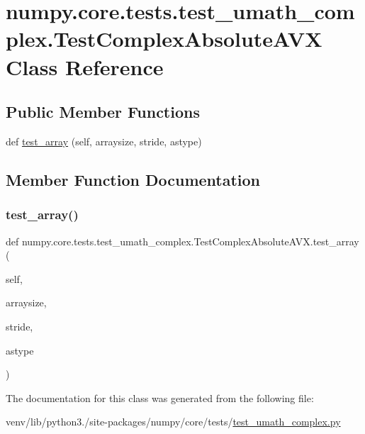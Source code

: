 \hypertarget{classnumpy_1_1core_1_1tests_1_1test__umath__complex_1_1TestComplexAbsoluteAVX}{}\section{numpy.\+core.\+tests.\+test\+\_\+umath\+\_\+complex.\+Test\+Complex\+Absolute\+A\+VX Class Reference}
\label{classnumpy_1_1core_1_1tests_1_1test__umath__complex_1_1TestComplexAbsoluteAVX}
\subsection*{Public Member Functions}
\begin{DoxyCompactItemize}
\item 
def \hyperlink{classnumpy_1_1core_1_1tests_1_1test__umath__complex_1_1TestComplexAbsoluteAVX_a608b4469cf3d6a8c4b2053120f3ecaca}{test\+\_\+array} (self, arraysize, stride, astype)
\end{DoxyCompactItemize}


\subsection{Member Function Documentation}
\mbox{\label{classnumpy_1_1core_1_1tests_1_1test__umath__complex_1_1TestComplexAbsoluteAVX_a608b4469cf3d6a8c4b2053120f3ecaca}} 
\subsubsection{\texorpdfstring{test\+\_\+array()}{test\_array()}}
{\footnotesize\ttfamily def numpy.\+core.\+tests.\+test\+\_\+umath\+\_\+complex.\+Test\+Complex\+Absolute\+A\+V\+X.\+test\+\_\+array (\begin{DoxyParamCaption}\item[{}]{self,  }\item[{}]{arraysize,  }\item[{}]{stride,  }\item[{}]{astype }\end{DoxyParamCaption})}



The documentation for this class was generated from the following file\+:\begin{DoxyCompactItemize}
\item 
venv/lib/python3./site-\/packages/numpy/core/tests/\hyperlink{test__umath__complex_8py}{test\+\_\+umath\+\_\+complex.\+py}\end{DoxyCompactItemize}
